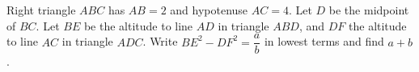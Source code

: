 Right triangle $ABC$ has $AB=2$ and hypotenuse $AC=4$. Let $D$ be the midpoint of $BC$. Let $BE$ be the altitude to line $AD$ in triangle $ABD$, and $DF$ the altitude to line $AC$ in triangle $ADC$. Write $BE^2-DF^2=\dfrac{a}{b}$ in lowest terms and find $a+b$.
